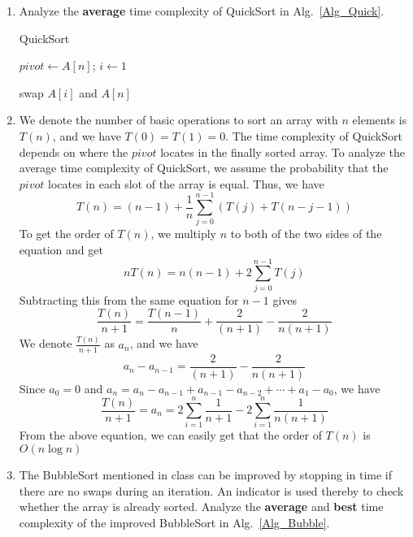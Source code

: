 \documentclass[12pt,a4paper]{article}
\makeatletter
\newtheorem*{solution}{Solution}
\theoremstyle{definition}
\renewenvironment{solution}[1][Solution] {\par\pushQED{\qed}\normalfont\topsep6\p@\@plus6\p@\relax\trivlist\item[\hskip\labelsep\bfseries#1\@addpunct{.}]\ignorespaces}{\popQED\endtrivlist\@endpefalse} \makeatother
\makeatother
\begin{document}
\begin{enumerate}
    \item
    Analyze the \textbf{average} time complexity of QuickSort in Alg.~\ref{Alg_Quick}.

    \begin{minipage}[t]{0.8\textwidth}
    \begin{algorithm}[H]

      \BlankLine
      \caption{QuickSort}\label{Alg_Quick}


      $pivot \leftarrow A[n]$; $i \leftarrow 1$\;

      swap $A[i]$ and $A[n]$\;
    \end{algorithm}
    \end{minipage}

    \begin{solution}
       We denote the number of basic operations to sort an array with $n$ elements is $T(n)$, and we have $T(0) = T(1) = 0$. The time complexity of QuickSort depends on where the $pivot$ locates in the finally sorted array. To analyze the average time complexity of QuickSort, we assume the probability that the $pivot$ locates in each slot of the array is equal. Thus, we have $$T(n) = (n-1) + \frac{1}{n}\sum_{j=0}^{n-1}(T(j) + T(n-j-1))$$ To get the order of $T(n)$, we multiply $n$ to both of the two sides of the equation and get $$nT(n) = n(n-1) + 2\sum_{j=0}^{n-1}T(j)$$ Subtracting this from the same equation for $n-1$ gives $$\frac{T(n)}{n+1} = \frac{T(n-1)}{n} + \frac{2}{(n+1)} - \frac{2}{n(n+1)}$$ We denote $\frac{T(n)}{n+1}$ as $a_{n}$, and we have $$a_{n} - a_{n-1} = \frac{2}{(n+1)} - \frac{2}{n(n+1)}$$ Since $a_{0} = 0$ and $a_{n} = a_{n} - a_{n-1} + a_{n-1} - a_{n-2} + \cdots + a_{1} - a_{0}$, we have $$\frac{T(n)}{n+1} = a_{n} = 2\sum_{i=1}^{n}\frac{1}{n+1} - 2\sum_{i=1}^{n}\frac{1}{n(n+1)}$$ From the above equation, we can easily get that the order of $T(n)$ is $O(n\log n)$
    \end{solution}

    \item
    The BubbleSort mentioned in class can be improved by stopping in time if there are no swaps during an iteration. An indicator is used thereby to check whether the array is already sorted. Analyze the \textbf{average} and \textbf{best} time complexity of the improved BubbleSort in Alg.~\ref{Alg_Bubble}.


\end{enumerate}
\end{document}
